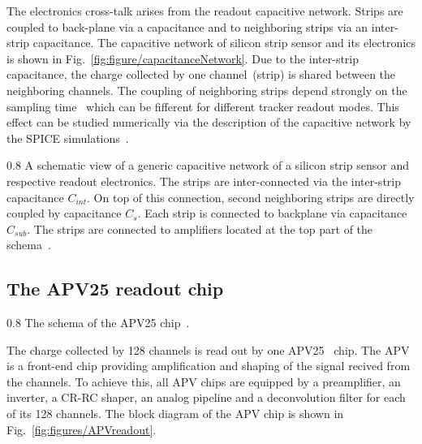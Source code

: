 The electronics cross-talk arises from the readout capacitive network. Strips are coupled to back-plane via a capacitance and to neighboring strips via an inter-strip capacitance. The capacitive network of silicon strip sensor and its electronics is shown in Fig.~\ref{fig:figure/capacitanceNetwork}. Due to the inter-strip capacitance, the charge collected by one channel~(strip) is shared between the neighboring channels. The coupling of neighboring strips depend strongly on the sampling time~\cite{Bloch:2007zza} which can be fifferent for different tracker readout modes. This effect can be studied numerically via the description of the capacitive network by the SPICE simulations~\cite{Barberis:1993ph}.


                 {0.8}       %
                 {A schematic view of a generic capacitive network of a silicon strip sensor and respective readout electronics. The strips are inter-connected via the inter-strip capacitance $C_{int}$. On top of this connection, second neighboring strips are directly coupled by capacitance $C_{s}$. Each strip is connected to backplane via capacitance $C_{sub}$. The strips are connected to amplifiers located at the top part of the schema~\cite{Lutz:1987wd}.}




\subsection{The APV25 readout chip \label{sec:APV}}


                 {0.8}       %
                 {The schema of the APV25 chip~\cite{Friedl:2001kra}.} %

The charge collected by 128 channels is read out by one APV25~\cite{French:2001xb} chip. The APV is a front-end chip providing amplification and shaping of the signal recived from the channels. To achieve this, all APV chips are equipped by a preamplifier, an inverter, a CR-RC shaper, an analog pipeline and a deconvolution filter for each of its 128 channels. The block diagram of the APV chip is shown in Fig.~\ref{fig:figures/APVreadout}.

